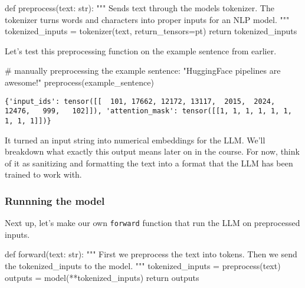 \documentclass[
  letterpaper,
  DIV=11,
  numbers=noendperiod]{scrartcl}
\newenvironment{Shaded}{\begin{snugshade}}{\end{snugshade}}
\newcommand{\BuiltInTok}[1]{\textcolor[rgb]{0.00,0.23,0.31}{#1}}
\newcommand{\CommentTok}[1]{\textcolor[rgb]{0.37,0.37,0.37}{#1}}
\newcommand{\ControlFlowTok}[1]{\textcolor[rgb]{0.00,0.23,0.31}{#1}}
\newcommand{\KeywordTok}[1]{\textcolor[rgb]{0.00,0.23,0.31}{#1}}
\newcommand{\NormalTok}[1]{\textcolor[rgb]{0.00,0.23,0.31}{#1}}
\newcommand{\OperatorTok}[1]{\textcolor[rgb]{0.37,0.37,0.37}{#1}}
\newcommand{\StringTok}[1]{\textcolor[rgb]{0.13,0.47,0.30}{#1}}
\begin{document}
\begin{Shaded}
\begin{Highlighting}[]
\KeywordTok{def}\NormalTok{ preprocess(text: }\BuiltInTok{str}\NormalTok{):}
    \CommentTok{"""}
\CommentTok{    Sends \textasciigrave{}text\textasciigrave{} through the model\textquotesingle{}s tokenizer.  }
\CommentTok{    The tokenizer turns words and characters into proper inputs for an NLP model.}
\CommentTok{    """}
\NormalTok{    tokenized\_inputs }\OperatorTok{=}\NormalTok{ tokenizer(text, return\_tensors}\OperatorTok{=}\StringTok{\textquotesingle{}pt\textquotesingle{}}\NormalTok{)}
    \ControlFlowTok{return}\NormalTok{ tokenized\_inputs}
\end{Highlighting}
\end{Shaded}

Let's test this preprocessing function on the example sentence from
earlier.

\begin{Shaded}
\begin{Highlighting}[]
\CommentTok{\# manually preprocessing the example sentence: "HuggingFace pipelines are awesome!"}
\NormalTok{preprocess(example\_sentence)}
\end{Highlighting}
\end{Shaded}

\begin{verbatim}
{'input_ids': tensor([[  101, 17662, 12172, 13117,  2015,  2024, 12476,   999,   102]]), 'attention_mask': tensor([[1, 1, 1, 1, 1, 1, 1, 1, 1]])}
\end{verbatim}

It turned an input string into numerical embeddings for the LLM. We'll
breakdown what exactly this output means later on in the course. For
now, think of it as sanitizing and formatting the text into a format
that the LLM has been trained to work with.

\subsubsection{Runnning the model}\label{runnning-the-model}

Next up, let's make our own \texttt{forward} function that run the LLM
on preprocessed inputs.

\begin{Shaded}
\begin{Highlighting}[]
\KeywordTok{def}\NormalTok{ forward(text: }\BuiltInTok{str}\NormalTok{):}
    \CommentTok{"""}
\CommentTok{    First we preprocess the \textasciigrave{}text\textasciigrave{} into tokens.}
\CommentTok{    Then we send the \textasciigrave{}tokenized\_inputs\textasciigrave{} to the model.}
\CommentTok{    """}
\NormalTok{    tokenized\_inputs }\OperatorTok{=}\NormalTok{ preprocess(text)}
\NormalTok{    outputs }\OperatorTok{=}\NormalTok{ model(}\OperatorTok{**}\NormalTok{tokenized\_inputs)}
    \ControlFlowTok{return}\NormalTok{ outputs}
\end{Highlighting}
\end{Shaded}
\end{document}
